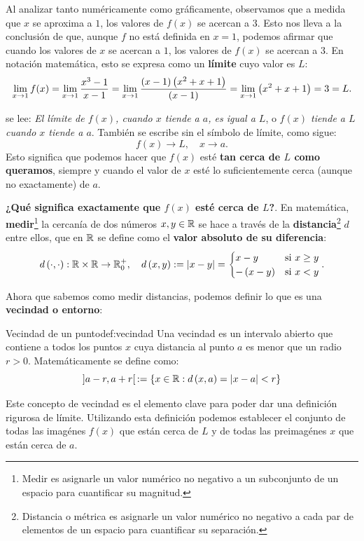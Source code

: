 Al analizar tanto numéricamente como gráficamente, observamos que a medida que $x$ se aproxima a $1$, los valores de $f(x)$ se acercan a $3$. Esto nos lleva a la conclusión de que, aunque $f$ no está definida en $x=1$, podemos afirmar que cuando los valores de $x$ se acercan a $1$, los valores de $f(x)$ se acercan a $3$. En notación matemática, esto se expresa como un \textbf{límite} cuyo valor es $L$:
\[ \lim_{x \to 1}{f(x)} = \lim_{x \to 1}{\frac{x^3 -1}{x-1}}=  \lim_{x \to 1}{\frac{\left( x-1 \right) \left( x^2+x+1 \right)}{\left( x-1 \right)}} = \lim_{x \to 1}{\left( x^2+x+1 \right)}  = 3 = L. \]

se lee: \emph{El límite de $f(x)$, cuando $x$ tiende a $a$, es igual a $L$}, o \emph{$f(x)$ tiende a $L$ cuando $x$ tiende a $a$}. También se escribe sin el símbolo de límite, como sigue:
\[ f(x) \to L, \quad x \to a. \]
Esto significa que podemos hacer que $f(x)$ esté \textbf{tan cerca de $L$ como queramos}, siempre y cuando el valor de $x$ esté lo suficientemente cerca (aunque no exactamente) de $a$.

\textbf{¿Qué significa exactamente que $f(x)$ esté cerca de $L$?}. En matemática, \textbf{medir}\footnote{Medir es asignarle un valor numérico no negativo a un subconjunto de un espacio para cuantificar su magnitud.} la cercanía de dos números $x,y \in \mathbb{R}$ se hace a través de la \textbf{distancia}\footnote{Distancia o métrica es asignarle un valor numérico no negativo a cada par de elementos de un espacio para cuantificar su separación.} $d$ entre ellos, que en $\mathbb{R}$ se define como el \textbf{valor absoluto de su diferencia}:
\[ d \left( \cdot , \cdot \right): \mathbb{R} \times \mathbb{R} \to \mathbb{R}^{+}_0, \quad d \left( x,y \right) := \left| x-y \right| = \begin{cases} x-y & \text{si } x \geq y \\ - \left( x-y \right) & \text{si } x<y \end{cases}. \]

Ahora que sabemos como medir distancias, podemos definir lo que es una \textbf{vecindad o entorno}:

\begin{definition}{Vecindad de un punto}{def:vecindad}
  Una vecindad es un intervalo abierto que contiene a todos los puntos $x$ cuya distancia al punto $a$ es menor que un radio $r>0$. Matemáticamente se define como:
  \[ ] a-r,a+r[ \, := \left\lbrace x \in \mathbb{R} : d \left( x,a \right) = \left| x-a \right| < r \right\rbrace  \]
\end{definition}

Este concepto de vecindad es el elemento clave para poder dar una definición rigurosa de límite. Utilizando esta definición podemos establecer el conjunto de todas las imagénes $f(x)$ que están cerca de $L$ y de todas las preimagénes $x$ que están cerca de $a$.  

